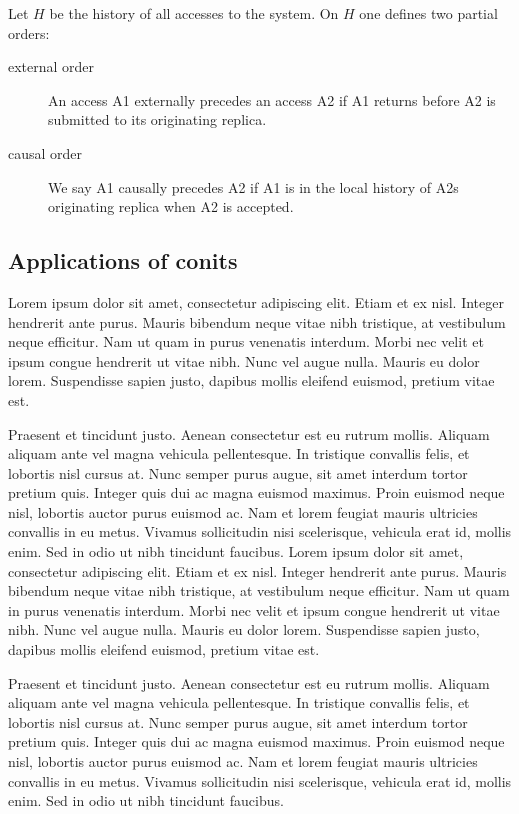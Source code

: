 Let $H$ be the history of all accesses to the system. On $H$ one
defines two partial orders:
\begin{description}
  \item[external order] An access A1 externally precedes an access A2 if A1 returns
  before A2 is submitted to its originating replica.
  \item[causal order] We say A1 causally precedes A2 if A1 is in the
    local history of A2s originating replica when A2 is accepted.
\end{description}

\subsection{Applications of conits}

Lorem ipsum dolor sit amet, consectetur adipiscing elit. Etiam et ex
nisl. Integer hendrerit ante purus. Mauris bibendum neque vitae nibh
tristique, at vestibulum neque efficitur. Nam ut quam in purus
venenatis interdum. Morbi nec velit et ipsum congue hendrerit ut vitae
nibh. Nunc vel augue nulla. Mauris eu dolor lorem. Suspendisse sapien
justo, dapibus mollis eleifend euismod, pretium vitae est.

Praesent et tincidunt justo. Aenean consectetur est eu rutrum
mollis. Aliquam aliquam ante vel magna vehicula pellentesque. In
tristique convallis felis, et lobortis nisl cursus at. Nunc semper
purus augue, sit amet interdum tortor pretium quis. Integer quis dui
ac magna euismod maximus. Proin euismod neque nisl, lobortis auctor
purus euismod ac. Nam et lorem feugiat mauris ultricies convallis in
eu metus. Vivamus sollicitudin nisi scelerisque, vehicula erat id,
mollis enim. Sed in odio ut nibh tincidunt faucibus.  Lorem ipsum
dolor sit amet, consectetur adipiscing elit. Etiam et ex nisl. Integer
hendrerit ante purus. Mauris bibendum neque vitae nibh tristique, at
vestibulum neque efficitur. Nam ut quam in purus venenatis
interdum. Morbi nec velit et ipsum congue hendrerit ut vitae
nibh. Nunc vel augue nulla. Mauris eu dolor lorem. Suspendisse sapien
justo, dapibus mollis eleifend euismod, pretium vitae est.

Praesent et tincidunt justo. Aenean consectetur est eu rutrum
mollis. Aliquam aliquam ante vel magna vehicula pellentesque. In
tristique convallis felis, et lobortis nisl cursus at. Nunc semper
purus augue, sit amet interdum tortor pretium quis. Integer quis dui
ac magna euismod maximus. Proin euismod neque nisl, lobortis auctor
purus euismod ac. Nam et lorem feugiat mauris ultricies convallis in
eu metus. Vivamus sollicitudin nisi scelerisque, vehicula erat id,
mollis enim. Sed in odio ut nibh tincidunt faucibus.

